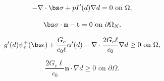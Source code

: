 \bigskip
\noindent
\begin{mdframed}[
    frametitle={\begin{equation}\label{uvc}\tag{UVC}\text{Unloaded Virtual Crack Formulation}\end{equation}},
    frametitlebackgroundcolor=gray!20,
    backgroundcolor=gray!5,
    linewidth=0pt,
    nobreak=true
  ]
  
\begin{equation}\label{disp equation box}
    -\nabla \cdot \bs\sigma  + pI'(d) \nabla d = 0 \text{ on }\Omega,
\end{equation}

\begin{equation}\label{disp bcs box}
    \bs\sigma\cdot \textbf{n} -\textbf{t} = 0 \text{ on }\partial\Omega_N.
\end{equation}

\begin{equation}\label{damage equation box}
    g'(d) \psi_e^+(\bs\epsilon)
    + \dfrac{G_c}{c_0\ell}\alpha'(d) - \nabla \cdot \dfrac{2G_c\ell}{c_0}\nabla d \ge 0 \text{ on }\Omega,
\end{equation}

\begin{equation}\label{damage bcs box}
    \dfrac{2G_c\ell}{c_0}\textbf{n}\cdot \nabla d \ge 0 \text{ on }\partial\Omega.
\end{equation}
  
\end{mdframed}
\hspace{.03\linewidth}
